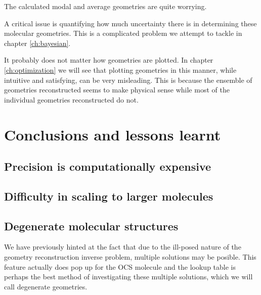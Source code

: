 The calculated modal and average geometries are quite worrying.

A critical issue is quantifying how much uncertainty there is in determining these molecular geometries. This is a complicated problem we attempt to tackle in chapter \ref{ch:bayesian}.

It probably does not matter how geometries are plotted. In chapter \ref{ch:optimization} we will see that plotting geometries in this manner, while intuitive and satisfying, can be very misleading. This is because the ensemble of geometries reconstructed seems to make physical sense while most of the individual geometries reconstructed do not.

\section{Conclusions and lessons learnt}
\subsection{Precision is computationally expensive}
\subsection{Difficulty in scaling to larger molecules}

\subsection{Degenerate molecular structures}
We have previously hinted at the fact that due to the ill-posed nature of the geometry reconstruction inverse problem, multiple solutions may be posible. This feature actually does pop up for the OCS molecule and the lookup table is perhaps the best method of investigating these multiple solutions, which we will call degenerate geometries.

